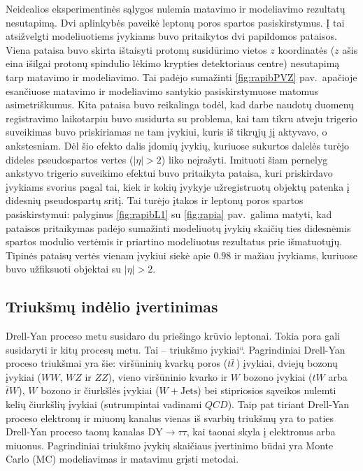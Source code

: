 \documentclass[a4paper, 12pt, twoside]{article}
\newcommand{\WJets}{W\! +\!\mathrm{Jets}}
\newcommand{\DYtau}{\mathrm{DY} \! \rightarrow \! \tau\tau}
\newcommand{\ltq}[1]{{\quotedblbase{}#1\textquotedblleft{}}}
\newcommand{\QCD}{QC\! D}
\newlength\q
\begin{document}
Neidealios eksperimentinės sąlygos nulemia matavimo ir modeliavimo rezultatų nesutapimą.
Dvi aplinkybės paveikė leptonų poros spartos pasiskirstymus.
Į tai atsižvelgti modeliuotiems įvykiams buvo pritaikytos dvi papildomos pataisos.
Viena pataisa buvo skirta ištaisyti protonų susidūrimo vietos $z$ koordinatės ($z$ ašis eina išilgai protonų
spindulio lėkimo krypties detektoriaus centre) nesutapimą tarp matavimo ir modeliavimo.
Tai padėjo sumažinti \ref{fig:rapibPVZ} pav.\ apačioje esančiuose matavimo ir modeliavimo santykio pasiskirstymuose
matomus asimetriškumus.
Kita pataisa buvo reikalinga todėl, kad darbe naudotų duomenų registravimo laikotarpiu buvo susidurta su problema,
kai tam tikru atveju trigerio suveikimas buvo priskiriamas ne tam įvykiui, kuris iš tikrųjų jį aktyvavo, o
ankstesniam.
Dėl šio efekto dalis įdomių įvykių, kuriuose sukurtos dalelės turėjo dideles pseudospartos vertes ($|\eta|>2$)
liko neįrašyti.
Imituoti šiam pernelyg ankstyvo trigerio suveikimo efektui buvo pritaikyta pataisa, kuri priskirdavo įvykiams
svorius pagal tai, kiek ir kokių įvykyje užregistruotų objektų patenka į didesnių pseudospartų sritį.
Tai turėjo įtakos ir leptonų poros spartos pasiskirstymui: palyginus \ref{fig:rapibL1} su \ref{fig:rapia} pav.\
galima matyti, kad pataisos pritaikymas padėjo sumažinti modeliuotų įvykių skaičių ties didesnėmis spartos modulio
vertėmis ir priartino modeliuotus rezultatus prie išmatuotųjų.
Tipinės pataisų vertės vienam įvykiui siekė apie $0.98$ ir mažiau įvykiams, kuriuose buvo užfiksuoti objektai su
$|\eta|>2$.


\subsection{Triukšmų indėlio įvertinimas}\label{sec:SignalBkg}
	 
Drell-Yan proceso metu susidaro du priešingo krūvio leptonai.
Tokia pora gali susidaryti ir kitų procesų metu.
Tai -- \ltq{triukšmo įvykiai}.
Pagrindiniai Drell-Yan proceso triukšmai yra šie: viršūninių kvarkų poros ($t\bar{t}\,$) įvykiai, dviejų bozonų
įvykiai ($WW$, $WZ$ ir $ZZ$), vieno viršūninio kvarko ir $W$ bozono įvykiai ($tW$ arba $\bar{t}W$), $W$ bozono
ir čiurkšlės įvykiai ($\WJets$) bei stipriosios sąveikos nulemti kelių čiurkšlių įvykiai (sutrumpintai vadinami $\QCD$).
Taip pat tiriant Drell-Yan proceso elektronų ir miuonų kanalus vienas iš svarbių triukšmų yra
to paties Drell-Yan proceso taonų kanalas $\DYtau$, kai taonai skyla į elektronus arba miuonus.
Pagrindiniai triukšmo įvykių skaičiaus įvertinimo būdai yra Monte Carlo (MC) modeliavimas ir
matavimu grįsti metodai.
\end{document}
